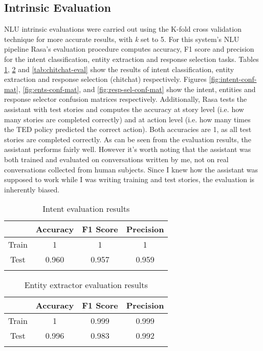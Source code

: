 \documentclass[journal, 11pt]{IEEEtran}
\begin{document}
\subsection{Intrinsic Evaluation}
NLU intrinsic evaluations were carried out using the K-fold cross validation technique for more accurate results, with \textit{k} set to 5.
For this system's NLU pipeline Rasa's evaluation procedure \cite{rasatest} computes accuracy, F1 score and precision for the intent classification, entity extraction and response selection tasks.
Tables \ref{tab:intent-eval}, \ref{tab:entity-eval} and \ref{tab:chitchat-eval} show the results of intent classification, entity extraction and response selection (chitchat) respectively.
Figures \ref{fig:intent-conf-mat}, \ref{fig:ents-conf-mat}, and \ref{fig:resp-sel-conf-mat} show the intent, entities and response selector confusion matrices respectively.
Additionally, Rasa tests the assistant with test stories and computes the accuracy at story level (i.e. how many stories are completed correctly) and at action level (i.e. how many times the TED policy predicted the correct action).
Both accuracies are 1, as all test stories are completed correctly.
As can be seen from the evaluation results, the assistant performs fairly well. However it's worth noting that the assistant was both trained and evaluated on conversations written by me, not on real conversations collected from human subjects.
Since I knew how the assistant was supposed to work while I was writing training and test stories, the evaluation is inherently biased.

\begin{table}[ht]
    \centering
    \begin{tabular}{@{}cccc@{}}
        \toprule
        \textbf{} & \textbf{Accuracy} & \textbf{F1 Score} & \textbf{Precision} \\ \midrule
        Train     & 1                 & 1                 & 1                  \\
        Test      & 0.960             & 0.957             & 0.959              \\ \bottomrule\\
    \end{tabular}
    \caption{Intent evaluation results}
    \label{tab:intent-eval}
\end{table}

\begin{table}[ht]
    \centering
    \begin{tabular}{@{}cccc@{}}
        \toprule
        \textbf{} & \textbf{Accuracy} & \textbf{F1 Score} & \textbf{Precision} \\ \midrule
        Train     & 1                 & 0.999             & 0.999              \\
        Test      & 0.996             & 0.983             & 0.992              \\ \bottomrule\\
    \end{tabular}
    \caption{Entity extractor evaluation results}
    \label{tab:entity-eval}
\end{table}
\end{document}
